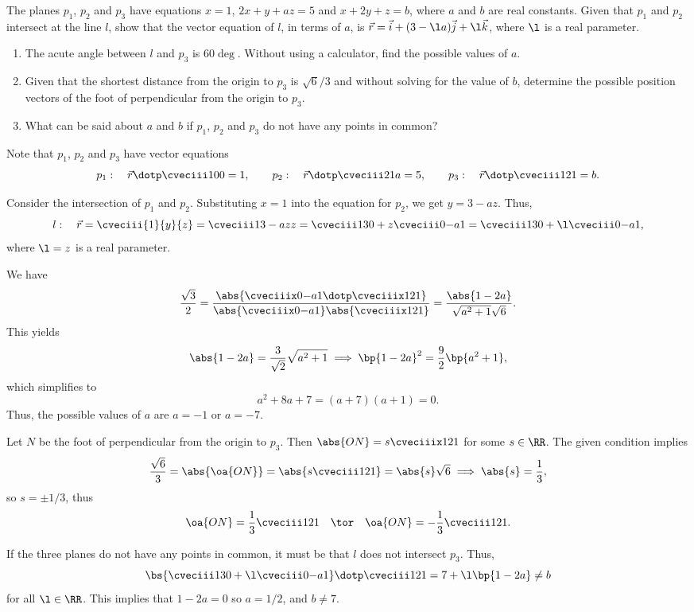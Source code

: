 \begin{problem}
    The planes $p_1$, $p_2$ and $p_3$ have equations $x = 1$, $2x + y + az = 5$ and $x + 2y + z = b$, where $a$ and $b$ are real constants. Given that $p_1$ and $p_2$ intersect at the line $l$, show that the vector equation of $l$, in terms of $a$, is $\vec r = \vec i + (3 - \l a)\vec j + \l \vec k$, where $\l$ is a real parameter.

    \begin{enumerate}
        \item The acute angle between $l$ and $p_3$ is $60\deg$. Without using a calculator, find the possible values of $a$.
        \item Given that the shortest distance from the origin to $p_3$ is $\sqrt6 / 3$ and without solving for the value of $b$, determine the possible position vectors of the foot of perpendicular from the origin to $p_3$.
        \item What can be said about $a$ and $b$ if $p_1$, $p_2$ and $p_3$ do not have any points in common?
    \end{enumerate}
\end{problem}
\begin{solution}
    Note that $p_1$, $p_2$ and $p_3$ have vector equations \[p_1: \quad \vec r \dotp \cveciii100 = 1, \quad\quad p_2: \quad \vec r \dotp \cveciii21a = 5, \quad \quad p_3: \quad \vec r \dotp \cveciii121 = b.\]

    Consider the intersection of $p_1$ and $p_2$. Substituting $x = 1$ into the equation for $p_2$, we get $y = 3 - az$. Thus, \[l: \quad \vec r = \cveciii{1}{y}{z} = \cveciii1{3-az}{z} = \cveciii130 + z \cveciii0{-a}{1} = \cveciii130 + \l \cveciii0{-a}1,\] where $\l = z$ is a real parameter.

    \begin{ppart}
        We have \[\frac{\sqrt3}{2} = \frac{\abs{\cveciiix0{-a}1 \dotp \cveciiix121}}{\abs{\cveciiix0{-a}1} \abs{\cveciiix121}} = \frac{\abs{1 - 2a}}{\sqrt{a^2 + 1} \sqrt{6}}.\] This yields \[\abs{1 - 2a} = \frac3{\sqrt2} \sqrt{a^2 + 1} \implies \bp{1 - 2a}^2 = \frac{9}{2} \bp{a^2 + 1},\] which simplifies to \[a^2 + 8a + 7 = (a+7)(a+1) = 0.\] Thus, the possible values of $a$ are $a = -1$ or $a = -7$.
    \end{ppart}
    \begin{ppart}
        Let $N$ be the foot of perpendicular from the origin to $p_3$. Then $\abs{ON} = s \cveciiix121$ for some $s \in \RR$. The given condition implies \[\frac{\sqrt6}{3} = \abs{\oa{ON}} = \abs{s \cveciii121} = \abs{s} \sqrt{6} \implies \abs{s} = \frac13,\] so $s = \pm 1/3$, thus \[\oa{ON} = \frac13 \cveciii121 \quad \tor \quad \oa{ON} = -\frac13 \cveciii121.\]
    \end{ppart}
    \begin{ppart}
        If the three planes do not have any points in common, it must be that $l$ does not intersect $p_3$. Thus, \[\bs{\cveciii130 + \l \cveciii0{-a}1} \dotp \cveciii121 = 7 + \l \bp{1-2a} \neq b\] for all $\l \in \RR$. This implies that $1-2a = 0$ so $a = 1/2$, and $b \neq 7$.
    \end{ppart}
\end{solution}

